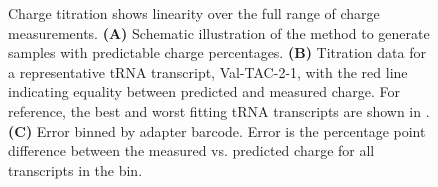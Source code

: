 \documentclass[9pt,lineno]{elife}
\begin{document}
\begin{figure}[ht!]
\centering
{}
\caption{
Charge titration shows linearity over the full range of charge measurements.
\textbf{(A)} Schematic illustration of the method to generate samples with predictable charge percentages.
\textbf{(B)} Titration data for a representative tRNA transcript, Val-TAC-2-1, with the red line indicating equality between predicted and measured charge.
For reference, the best and worst fitting tRNA transcripts are shown in .
\textbf{(C)} Error binned by adapter barcode.
Error is the percentage point difference between the measured vs. predicted charge for all transcripts in the bin.
}
\label{fig:Fig5}

\label{figsupp:f5S1}


\end{figure}
\end{document}

